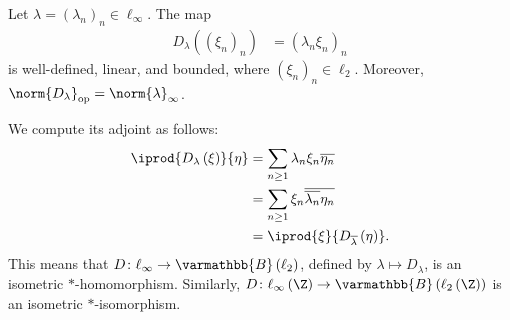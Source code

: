 \documentclass[10pt]{mypackage}
\renewcommand*{\mathbb}[1]{\varmathbb{#1}}
\newcommand{\B}{\mathbb{B}}
\begin{document}
\begin{example}
  Let $\lambda = \left(\lambda_n\right)_n\in \ell_{\infty}$. The map
  \begin{align*}
    D_{\lambda}\left(\left(\xi_n\right)_n\right) &= \left(\lambda_n\xi_n\right)_n
  \end{align*}
  is well-defined, linear, and bounded, where $\left(\xi_n\right)_n\in \ell_2$. Moreover, $\norm{D_{\lambda}}_{\text{op}} = \norm{\lambda}_{\infty}$.\newline

  We compute its adjoint as follows:
  \begin{align*}
    \iprod{D_{\lambda}\left(\xi\right)}{\eta} &= \sum_{n\geq 1}\lambda_n\xi_n \overline{\eta_n}\\
                                              &= \sum_{n\geq 1}\xi_n \overline{\overline{\lambda_n}\eta_n}\\
                                              &= \iprod{\xi}{D_{\overline{\lambda}}\left(\eta\right)}.
  \end{align*}
  This means that $D\colon \ell_{\infty}\rightarrow \B\left(\ell_2\right)$, defined by $\lambda \mapsto D_{\lambda}$, is an isometric $\ast$-homomorphism. Similarly, $D\colon \ell_{\infty}\left(\Z\right)\rightarrow \B\left(\ell_2\left(\Z\right)\right)$ is an isometric $\ast$-isomorphism.
\end{example}
\end{document}
